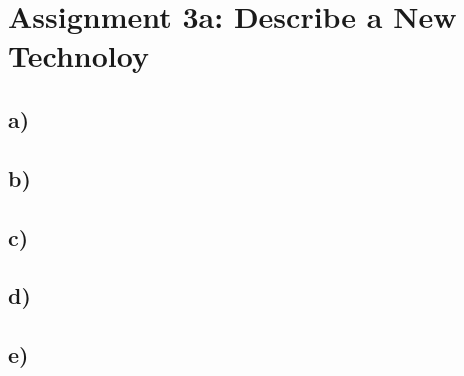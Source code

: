 \section*{Assignment 3a: Describe a New Technoloy} 

\subsection*{a)}

\subsection*{b)}

\subsection*{c)}

\subsection*{d)}

\subsection*{e)}
